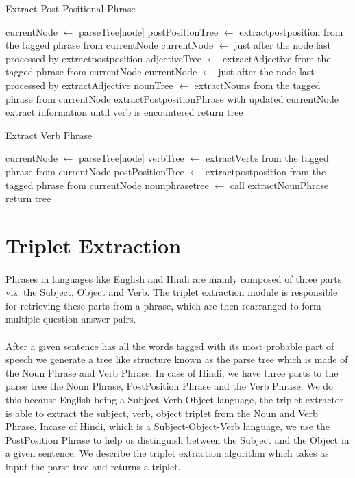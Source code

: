 \begin {algorithm}
\caption {Extract Post Positional Phrase}
\begin {algorithmic}[1]
\State currentNode $\gets$ parseTree[node]
 \State postPositionTree $\gets$ extractpostposition from the tagged phrase from currentNode
\State currentNode $\gets$ just after the node last processed by extractpostposition
\State adjectiveTree $\gets$ extractAdjective from the tagged phrase from currentNode
\State currentNode $\gets$ just after the node last processed by extractAdjective
\State nounTree $\gets$ extractNouns from the tagged phrase from currentNode
\State extractPostpositionPhrase with updated currentNode extract information until verb is encountered
\EndIf
\State return tree
\EndProcedure		
\end {algorithmic}
\end {algorithm}

\begin {algorithm}
\caption {Extract Verb Phrase}
\begin {algorithmic}[1]
\State currentNode $\gets$ parseTree[node]
\State verbTree $\gets$ extractVerbs from the tagged phrase from currentNode
\State postPositionTree $\gets$ extractpostposition from the tagged phrase from currentNode
\State nounphrasetree $\gets$ call extractNounPhrase
\State return tree
\EndProcedure		
\end {algorithmic}
\end {algorithm}

\section{Triplet Extraction}
\paragraph{}
Phrases in languages like English and Hindi are mainly composed of three parts viz. the Subject, Object and Verb. The triplet extraction module is responsible for retrieving these parts from a phrase, which are then rearranged to form multiple question answer pairs.

\paragraph{}
After a given sentence has all the words tagged with its most probable part of speech we generate a tree like structure known as the parse tree which is made of the Noun Phrase and Verb Phrase. In case of Hindi, we have  three parts to the parse tree the Noun Phrase, PostPosition Phrase and the Verb Phrase. We do this because English being a Subject-Verb-Object language, the triplet extractor is able to extract the subject, verb, object triplet from the Noun and Verb Phrase. Incase of Hindi, which is a Subject-Object-Verb language, we use the PostPosition Phrase to help us distinguish between the Subject and the Object in a given sentence. We describe the triplet extraction algorithm which takes as input the parse tree and returns a triplet.

